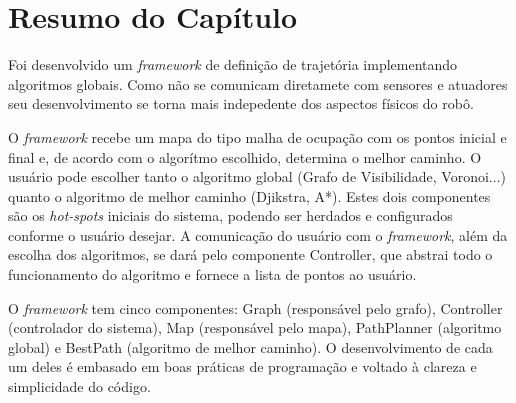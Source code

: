 \section{Resumo do Capítulo}

Foi desenvolvido um \textit{framework} de definição de trajetória implementando algoritmos globais. Como não se comunicam diretamete com sensores e atuadores seu desenvolvimento se torna mais indepedente dos aspectos físicos do robô.

O \textit{framework} recebe um mapa do tipo malha de ocupação com os pontos inicial e final e, de acordo com o algorítmo escolhido, determina o melhor caminho. O usuário pode escolher tanto o algoritmo global (Grafo de Visibilidade, Voronoi...) quanto o algoritmo de melhor caminho (Djikstra, A*). Estes dois componentes são os \textit{hot-spots} iniciais do sistema, podendo ser herdados e configurados conforme o usuário desejar. A comunicação do usuário com o \textit{framework}, além da escolha dos algoritmos, se dará pelo componente Controller, que abstrai todo o funcionamento do algoritmo e fornece a lista de pontos ao usuário.

O \textit{framework} tem cinco componentes: Graph (responsável pelo grafo), Controller (controlador do sistema), Map (responsável pelo mapa), PathPlanner (algoritmo global) e BestPath (algoritmo de melhor caminho). O desenvolvimento de cada um deles é embasado em boas práticas de programação e voltado à clareza e simplicidade do código.